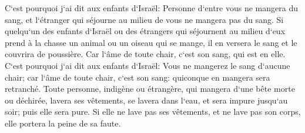 \verse C`est pourquoi j`ai dit aux enfants d`Israël: Personne d`entre vous ne mangera du sang, et l`étranger qui séjourne au milieu de vous ne mangera pas du sang. 
\verse Si quelqu`un des enfants d`Israël ou des étrangers qui séjournent au milieu d`eux prend à la chasse un animal ou un oiseau qui se mange, il en versera le sang et le couvrira de poussière. 
\verse Car l`âme de toute chair, c`est son sang, qui est en elle. C`est pourquoi j`ai dit aux enfants d`Israël: Vous ne mangerez le sang d`aucune chair; car l`âme de toute chair, c`est son sang: quiconque en mangera sera retranché. 
\verse Toute personne, indigène ou étrangère, qui mangera d`une bête morte ou déchirée, lavera ses vêtements, se lavera dans l`eau, et sera impure jusqu`au soir; puis elle sera pure. 
\verse Si elle ne lave pas ses vêtements, et ne lave pas son corps, elle portera la peine de sa faute. 

